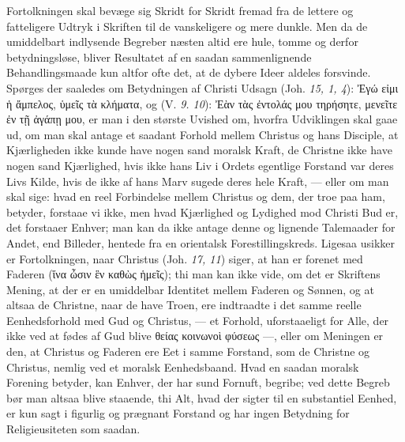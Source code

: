 \documentclass[12pt]{book}
\newcommand{\opage}[1]{\marginnote{\footnotesize\textit{[#1]}}}
\begin{document}
Fortolkningen skal bevæge sig Skridt for Skridt fremad fra de lettere og
fatteligere Udtryk i Skriften til de vanskeligere og mere dunkle. Men da de
umiddelbart indlysende Begreber næsten altid ere hule, tomme og derfor
betydningsløse, bliver Resultatet af en saadan sammenlignende
Behandlingsmaade kun altfor ofte det, at de dybere Ideer aldeles forsvinde.
Spørges der saaledes om Betydningen af Christi Udsagn (Joh. \textit{15, 1, 4}):
Ἐγώ εἰμι ἡ ἄμπελος, ὑμεῖς τὰ κλήματα, og (V. \textit{9. 10}): Ἐὰν τὰς
ἐντολάς μου τηρήσητε, μενεῖτε ἐν τῇ ἀγάπῃ μου, er man i den største Uvished
om, hvorfra Udviklingen skal gaae ud, om man skal antage et saadant Forhold
mellem Christus og hans Disciple, at Kjærligheden ikke kunde have nogen sand
moralsk Kraft, de Christne ikke have nogen sand Kjærlighed, hvis ikke hans Liv
i Ordets egentlige Forstand var deres Livs Kilde, hvis de ikke af hans Marv
sugede deres hele Kraft, --- eller om man skal sige: hvad en reel Forbindelse
mellem Christus og dem, der troe paa ham, betyder, forstaae vi ikke, men hvad
Kjærlighed og Lydighed mod Christi Bud er, det forstaaer Enhver; man kan da
ikke antage denne og lignende Talemaader for Andet, end Billeder, hentede fra
en orientalsk Forestillingskreds. Ligesaa usikker er Fortolkningen, naar
Christus (Joh. \textit{17, 11}) siger, at han er forenet med Faderen (ἵνα ὦσιν
ἓν καθὼς ἡμεῖς); thi man kan ikke vide, om det er Skriftens Mening, at der er
en umiddelbar Identitet mellem Faderen og Sønnen, og at altsaa de Christne,
naar de have Troen, ere indtraadte i det
\opage{111} \setcounter{footnote}{0}%
samme reelle Eenhedsforhold med Gud og Christus, --- et Forhold, uforstaaeligt
for Alle, der ikke ved at fødes af Gud blive θείας κοινωνοὶ φύσεως ---, eller
om Meningen er den, at Christus og Faderen ere Eet i samme Forstand, som de
Christne og Christus, nemlig ved et moralsk Eenhedsbaand. Hvad en saadan
moralsk Forening betyder, kan Enhver, der har sund Fornuft, begribe; ved dette
Begreb bør man altsaa blive staaende, thi Alt, hvad der sigter til en
substantiel Eenhed, er kun sagt i figurlig og prægnant Forstand og har ingen
Betydning for Religieusiteten som saadan.
\end{document}
